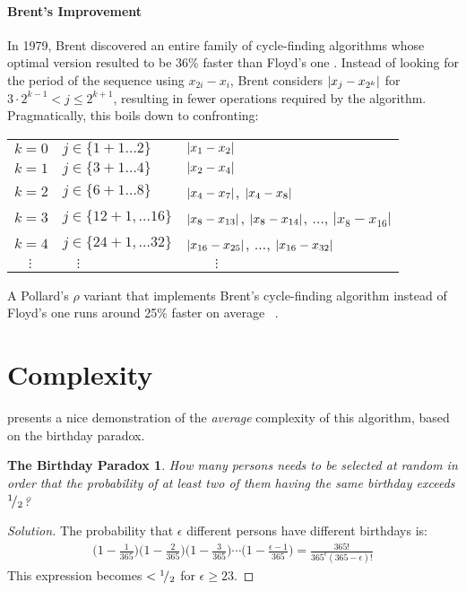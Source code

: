 \paragraph{Brent's Improvement} In 1979, Brent discovered an entire family of
cycle-finding algorithms whose optimal version resulted to be 36\% faster than
Floyd's one \cite{pollard-brent}.
Instead of looking for the period of the sequence using $x_{2i} - x_i$, Brent
considers
$\left|x_j - x_{2^k}\right|$ for $ 3 \cdot 2^{k-1} < j \leq 2^{k+1}$, resulting in
fewer operations required by the algorithm. Pragmatically, this boils down to
confronting:

\medskip
\begin{tabular}{l@{\hskip 40pt} l@{\hskip 50pt} l}
  $k = 0$ & $j \in \{1+1 \ldots 2\}$ & $\left|x_1 - x_2\right|$ \\
  $k = 1$ & $j \in \{3+1 \ldots 4\}$ & $\left|x_2 - x_4\right|$ \\
  $k = 2$ & $j \in \{6+1 \ldots 8\}$ & $\left|x_4 - x_7\right|$, $\left|x_4 - x_8\right|$ \\
  $k = 3$ & $j \in \{12+1, \ldots 16\}$ &
            $\left|x_8 - x_{13}\right|$, $\left|x_8 -x_{14}\right|$, $\ldots$, $|x_8 - x_{16}|$\\
  $k = 4$ & $j \in \{24+1, \ldots 32 \}$ &
            $\left|x_{16} - x_{25}\right|$, $\ldots$, $\left|x_{16} - x_{32}\right|$ \\[2pt]
  $\quad \vdots$ & $\quad \vdots$ & $\quad \quad \vdots$ \\
\end{tabular}


A Pollard's $\rho$ variant that implements Brent's cycle-finding algorithm
instead of Floyd's one runs around 25\% faster on average
~\cite{pollard-brent}.

\section{Complexity}
\cite{riesel} presents a nice demonstration of the \emph{average} complexity of
this algorithm, based on the birthday paradox.
\newtheorem*{birthday}{The Birthday Paradox}
\begin{birthday}
  How many persons needs to be selected at random in order that the probability
  of at least two of them having the same birthday exceeds ${}^{1}\!/_{2}$?
\end{birthday}

\begin{proof}[Solution]
  The probability that $\epsilon$ different persons have different birthdays is:
  \begin{align*}
    \Big(1 - \frac{1}{365}\Big)
    \Big(1 - \frac{2}{365}\Big)
    \Big(1 - \frac{3}{365}\Big)
    \cdots
    \Big(1 - \frac{\epsilon -1}{365}\Big)
    =
    \frac{365!}{365^\epsilon (365-\epsilon)!}
  \end{align*}
  This expression becomes $< {}^{1}\!/_{2}$ for $\epsilon \geq 23$.
\end{proof}

